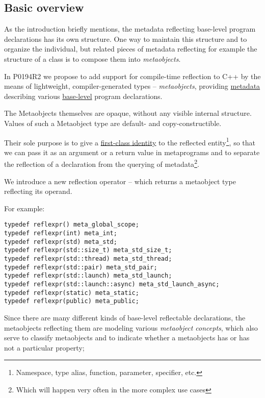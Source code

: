 \subsection{Basic overview}

As the introduction briefly mentions, the metadata reflecting base-level
program declarations has its own structure. One way to maintain this structure
and to organize the individual, but related pieces of metadata reflecting
for example the structure of a class is to compose them into {\em metaobjects}.

In P0194R2 we propose to add support for
compile-time reflection to C++ by the means of lightweight, compiler-generated
types -- {\em metaobjects}, providing \hyperref[term-metadata]{metadata}
describing various \hyperref[term-base-meta-level]{base-level} program declarations.

The Metaobjects themselves are opaque, without any visible internal structure.
Values of such a Metaobject type are default- and copy-constructible.

Their sole purpose is to give a \hyperref[term-first-class]{first-class identity}
to the reflected entity\footnote{Namespace, type alias, function, parameter,
specifier, etc.}, so that we can pass it as an argument or a return value
in metaprograms and to separate the reflection of a declaration from the querying
of metadata\footnote {Which will happen very often in the more complex use cases}.

We introduce a new reflection operator -- \verb@reflexpr@ which returns a
metaobject type reflecting its operand.

For example:

\begin{verbatim}
typedef reflexpr() meta_global_scope;
typedef reflexpr(int) meta_int;
typedef reflexpr(std) meta_std;
typedef reflexpr(std::size_t) meta_std_size_t;
typedef reflexpr(std::thread) meta_std_thread;
typedef reflexpr(std::pair) meta_std_pair;
typedef reflexpr(std::launch) meta_std_launch;
typedef reflexpr(std::launch::async) meta_std_launch_async;
typedef reflexpr(static) meta_static;
typedef reflexpr(public) meta_public;
\end{verbatim}

Since there are many different kinds of
base-level reflectable declarations, the metaobjects reflecting them are
modeling various {\em metaobject concepts}, which also serve to classify
metaobjects and to indicate whether a metaobjects has or has not a particular
property;

